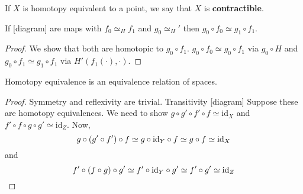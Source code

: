 \documentclass{article}
\newcommand{\id}{\mathrm{id}}
\numberwithin{nthm}{subsection}
\begin{document}
\begin{ndef}
    If $X$ is homotopy equivalent to a point, we say that $X$ is \textbf{contractible}.
\end{ndef}

\begin{nlemma}
    If
    [diagram]
    are maps with $f_0 \simeq_H f_1$ and $g_0 \simeq_H'$ then $g_0 \circ f_0 \simeq g_1 \circ f_1$.
\end{nlemma}

\begin{proof}
    We show that both are homotopic to $g_0 \circ f_1$.  $g_0 \circ f_0 \simeq g_0 \circ f_1$ via $g_0 \circ H$ and $g_0 \circ f_1 \simeq g_1 \circ f_1$ via $H'(f_1(\cdot), \cdot)$.
\end{proof}

\begin{prop}
    Homotopy equivalence is an equivalence relation of spaces.
\end{prop}

\begin{proof}
    Symmetry and reflexivity are trivial. Transitivity [diagram]
    Suppose these are homotopy equivalences. We need to show $g \circ g' \circ f' \circ f \simeq \id_X$ and $f' \circ f \circ g \circ g' \simeq \id_Z$.
    Now,
    \begin{equation*}
        g \circ (g' \circ f') \circ f \simeq g \circ \id_Y \circ f \simeq g \circ f \simeq \id_X \\
    \end{equation*}
    and
    \begin{equation*}
        f' \circ (f \circ g) \circ g' \simeq f' \circ \id_Y \circ g' \simeq f' \circ g' \simeq \id_Z \\
    \end{equation*}
\end{proof}
\end{document}
